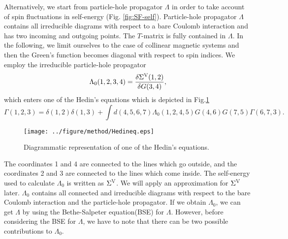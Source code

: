 Alternatively, we start from particle-hole propagator $\Lambda$ in order to 
take account of spin fluctuations in self-energy (Fig. \ref{fig:SF-self}).
Particle-hole propagator $\Lambda$ contains all irreducible 
diagrams with respect to a bare Coulomb interaction and has two 
incoming and outgoing points. The $T$-matrix is fully contained in $\Lambda$.
In the following, we limit ourselves to the case of collinear magnetic systems and 
then the Green's function becomes diagonal with respect to spin indices.
We employ the irreducible particle-hole propagator\cite{Arya2008}
%
\begin{equation}
	\Lambda_0(1,2,3,4) = \frac{\delta\Sigma^{\rm V}(1,2)}{\delta G(3,4)},
	\label{eq:lambda0}
\end{equation}
%
which enters one of the Hedin's equations\cite{Sole1994} which is depicted in Fig.\ref{fig:Hedineq}
%
\begin{equation}
	\Gamma(1,2,3) = \delta(1,2)\delta(1,3) + 
	\int d(4,5,6,7)\Lambda_0(1,2,4,5)
	G(4,6)G(7,5)\Gamma(6,7,3).
	\label{eq:Hedineq}
\end{equation}
%
\begin{figure} %
	\centering
	\texttt{[image: ../figure/method/Hedineq.eps]}
	\caption{Diagrammatic representation of one of the Hedin's equations.}
	\label{fig:Hedineq}
\end{figure}
The coordinates 1 and 4 are connected to the lines which go outside,
and the coordinates 2 and 3 are connected to the lines which come inside.
The self-energy used to calculate $\Lambda_0$ is written as $\Sigma^{\rm V}$.
We will apply an approximation for $\Sigma^{\rm V}$ later.
$\Lambda_0$ contains all connected and irreducible diagrams with
respect to the bare Coulomb interaction and the particle-hole propagator.
If we obtain $\Lambda_0$, we can get $\Lambda$ by using the
Bethe-Salpeter equation(BSE)\cite{BSE1951} for $\Lambda$.
However, before considering the BSE for $\Lambda$, we have to note that
there can be two possible contributions to $\Lambda_0$.

